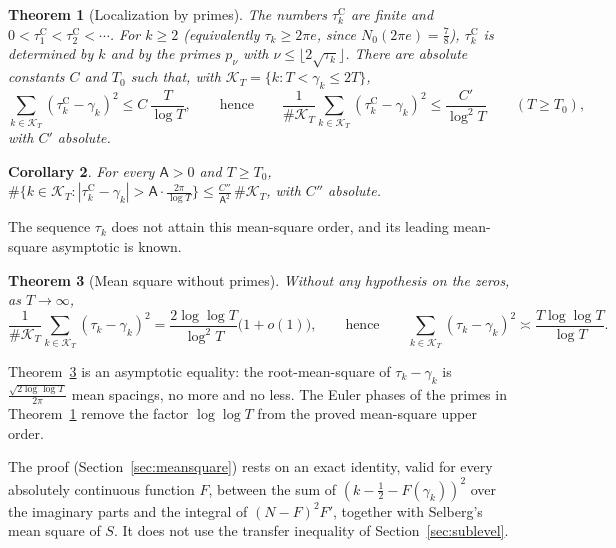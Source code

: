 \documentclass[11pt,a4paper]{article}
\makeatletter
\numberwithin{equation}{section}
\DeclareRobustCommand{\CGref}[1]{\ref{#1}}
\let\CG@origref\ref
\newcommand{\CG@gettip}[1]{\@ifundefined{CGTip@#1}{#1}{\csname CGTip@#1\endcsname}}
\DeclareRobustCommand{\CGref}[1]{\pdftooltip{\CG@origref{#1}}{\CG@gettip{#1}}}
\newtheorem{theorem}{Theorem}[section]
\newtheorem{corollary}[theorem]{Corollary}
\theoremstyle{definition}
\theoremstyle{remark}
\newcommand{\Nz}{N_0} %
\newcommand{\Kc}{\mathcal K}
\makeatother
\begin{document}
\begin{theorem}[Localization by primes]\label{thm:sublevel}
The numbers $\tau_{k}^{\mathrm C}$ are finite and $0<\tau_{1}^{\mathrm C}<\tau_{2}^{\mathrm C}<\cdots$. For $k\ge2$ (equivalently $\tau_k\ge2\pi e$, since $\Nz(2\pi e)=\frac78$), $\tau_{k}^{\mathrm C}$ is determined by $k$ and by the primes $p_\nu$ with $\nu\le\lfloor2\sqrt{\tau_k}\rfloor$. There are absolute constants $C$ and $T_0$ such that, with $\Kc_T=\{k:T<\gamma_k\le2T\}$,
\begin{equation}
\sum_{k\in\Kc_T}(\tau_{k}^{\mathrm C}-\gamma_k)^2\le C\,\frac T{\log T},\qquad\text{hence}\qquad \frac1{\#\Kc_T}\sum_{k\in\Kc_T}(\tau_{k}^{\mathrm C}-\gamma_k)^2\le\frac{C'}{\log^2T}\qquad(T\ge T_0),
\label{eq:main_sublevel}
\end{equation}
with $C'$ absolute.
\end{theorem}

\begin{corollary}\label{cor:proportion}
For every $\mathsf A>0$ and $T\ge T_0$, $\#\{k\in\Kc_T:|\tau_{k}^{\mathrm C}-\gamma_k|>\mathsf A\cdot\frac{2\pi}{\log T}\}\le\frac{C''}{\mathsf A^2}\,\#\Kc_T$, with $C''$ absolute.
\end{corollary}

The sequence $\tau_k$ does not attain this mean-square order, and its leading mean-square asymptotic is known.

\begin{theorem}[Mean square without primes]\label{thm:meansquare}
Without any hypothesis on the zeros, as $T\to\infty$,
\begin{equation}
\frac1{\#\Kc_T}\sum_{k\in\Kc_T}(\tau_k-\gamma_k)^2=\frac{2\log\log T}{\log^2T}\bigl(1+o(1)\bigr),\qquad\text{hence}\qquad \sum_{k\in\Kc_T}(\tau_k-\gamma_k)^2\asymp\frac{T\log\log T}{\log T}.
\label{eq:meansquare}
\end{equation}
\end{theorem}

Theorem~\CGref{thm:meansquare} is an asymptotic equality: the root-mean-square of $\tau_k-\gamma_k$ is $\frac{\sqrt{2\log\log T}}{2\pi}$ mean spacings, no more and no less. The Euler phases of the primes in Theorem~\CGref{thm:sublevel} remove the factor $\log\log T$ from the proved mean-square upper order. \par
The proof (Section~\CGref{sec:meansquare}) rests on an exact identity, valid for every absolutely continuous function $F$, between the sum of $(k-\frac12-F(\gamma_k))^2$ over the imaginary parts and the integral of $(N-F)^2F'$, together with Selberg's mean square of $S$. It does not use the transfer inequality of Section~\CGref{sec:sublevel}.
\end{document}
